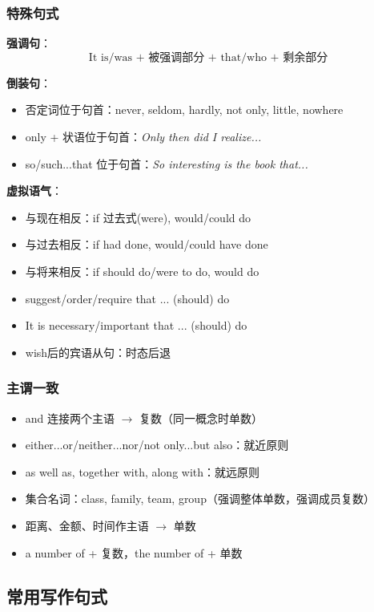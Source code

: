 \subsubsection{特殊句式}

\textbf{强调句}：
\[
\text{It is/was + 被强调部分 + that/who + 剩余部分}
\]

\textbf{倒装句}：
\begin{itemize}
  \item 否定词位于句首：never, seldom, hardly, not only, little, nowhere
  \item only + 状语位于句首：\textit{Only then did I realize...}
  \item so/such...that 位于句首：\textit{So interesting is the book that...}
\end{itemize}

\textbf{虚拟语气}：
\begin{itemize}
  \item 与现在相反：if 过去式(were), would/could do
  \item 与过去相反：if had done, would/could have done
  \item 与将来相反：if should do/were to do, would do
  \item suggest/order/require that ... (should) do
  \item It is necessary/important that ... (should) do
  \item wish后的宾语从句：时态后退
\end{itemize}

\subsubsection{主谓一致}

\begin{itemize}
  \item and 连接两个主语 $\rightarrow$ 复数（同一概念时单数）
  \item either...or/neither...nor/not only...but also：就近原则
  \item as well as, together with, along with：就远原则
  \item 集合名词：class, family, team, group（强调整体单数，强调成员复数）
  \item 距离、金额、时间作主语 $\rightarrow$ 单数
  \item a number of + 复数，the number of + 单数
\end{itemize}

\subsection{常用写作句式}

